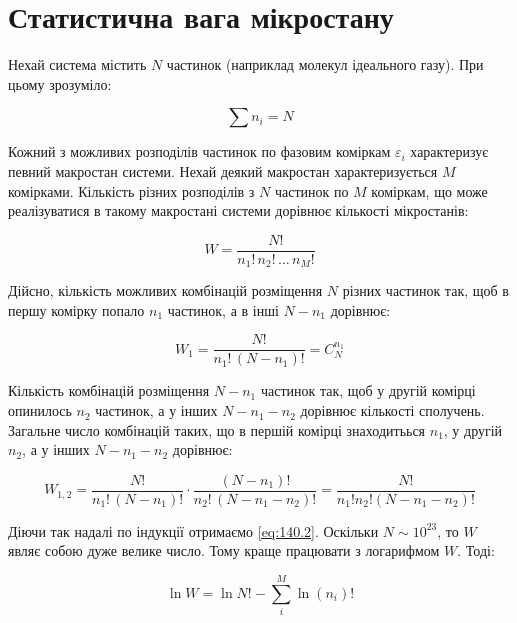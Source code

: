 \section{Статистична вага мікростану}

Нехай система містить $N$ частинок (наприклад молекул ідеального газу). При цьому зрозуміло:

\begin{equation}
	\sum n_i = N
	\label{eq:140.1}
\end{equation}

Кожний з можливих розподілів частинок по фазовим коміркам $\varepsilon_i$ характеризує певний макростан системи. Нехай деякий макростан характеризується $M$ комірками. Кількість різних розподілів з $N$ частинок по $M$ коміркам, що може реалізуватися в такому макростані системи дорівнює кількості мікростанів:

\begin{equation}
	W = \frac{N!}{n_1! \, n_2! \, \dots \, n_M!}
	\label{eq:140.2}
\end{equation}

Дійсно, кількість можливих комбінацій розміщення $N$ різних частинок так, щоб в першу комірку попало $n_1$ частинок, а в інші $N - n_1$ дорівнює:

\begin{equation}
	W_1 = \frac{N!}{n_1! \, (N - n_1)!} = C_N^{n_1}
	\label{eq:140.3}
\end{equation}

Кількість комбінацій розміщення $N - n_1$ частинок так, щоб у другій комірці опинилось $n_2$ частинок, а у інших $N - n_1 - n_2$ дорівнює кількості сполучень. Загальне число комбінацій таких, що в першій комірці знаходитьься $n_1$, у другій $n_2$, а у інших $N - n_1 - n_2$ дорівнює:

\begin{equation}
	W_{1,2} = \frac{N!}{n_1! \, (N - n_1)!} \cdot \frac{(N - n_1)!}{n_2! \, (N - n_1 - n_2)!} = \frac{N!}{n_1! n_2! (N - n_1 - n_2)!}
	\label{eq:140.4}
\end{equation}

Діючи так надалі по індукції отримаємо \eqref{eq:140.2}. Оскільки $N \sim 10^{23}$, то $W$ являє собою дуже велике число. Тому краще працювати з логарифмом $W$. Тоді:

\begin{equation}
	\ln W = \ln N! - \sum_i^M \ln (n_i)!
	\label{eq:140.5}
\end{equation}

